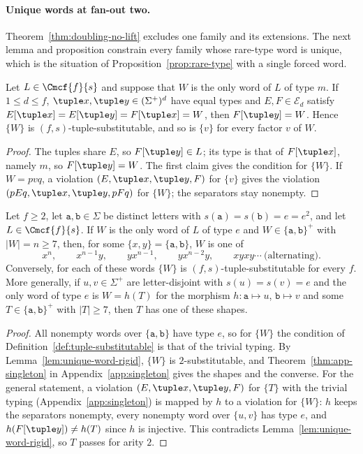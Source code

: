 \paragraph{Unique words at fan-out two.}
Theorem~\ref{thm:doubling-no-lift} excludes one family and its extensions.  The next lemma and
proposition constrain every family whose rare-type word is unique, which is the
situation of Proposition~\ref{prop:rare-type} with a single forced word.

\begin{lemma}
\label{lem:unique-word-rigid}
Let $L\in\Cmcf{f}{s}$ and suppose that $W$ is the only word of $L$ of type $m$.
If $1\le d\le f$, $\tuple x,\tuple y\in(\Sigma^+)^d$ have equal types and
$E,F\in\mathcal E_d$ satisfy $E[\tuple x]=E[\tuple y]=F[\tuple x]=W$, then
$F[\tuple y]=W$.  Hence $\{W\}$ is $(f,s)$-tuple-substitutable, and so is $\{v\}$
for every factor $v$ of $W$.
\end{lemma}

\begin{proof}
The tuples share $E$, so $F[\tuple y]\in L$; its type is that of $F[\tuple x]$,
namely $m$, so $F[\tuple y]=W$.  The first claim gives the condition for $\{W\}$.
If $W=pvq$, a violation $(E,\tuple x,\tuple y,F)$ for $\{v\}$ gives the violation
$(pEq,\tuple x,\tuple y,pFq)$ for $\{W\}$; the separators stay nonempty.
\end{proof}

\begin{proposition}
\label{prop:unique-two-letter-shapes}
Let $f\ge2$, let $\mathtt a,\mathtt b\in\Sigma$ be distinct letters with
$s(\mathtt a)=s(\mathtt b)=e=e^2$, and let $L\in\Cmcf{f}{s}$.  If $W$ is the only
word of $L$ of type $e$ and $W\in\{\mathtt a,\mathtt b\}^+$ with $|W|=n\ge7$, then,
for some $\{x,y\}=\{\mathtt a,\mathtt b\}$, $W$ is one of
\[
 x^n,\qquad x^{n-1}y,\qquad yx^{n-1},\qquad yx^{n-2}y,\qquad
 xyxy\cdots\ \text{(alternating)}.
\]
Conversely, for each of these words $\{W\}$ is $(f,s)$-tuple-substitutable for
every $f$.  More generally, if $u,v\in\Sigma^+$ are letter-disjoint with
$s(u)=s(v)=e$ and the only word of type $e$ is $W=h(T)$ for the morphism
$h:\mathtt a\mapsto u$, $\mathtt b\mapsto v$ and some $T\in\{\mathtt a,\mathtt b\}^+$ with
$|T|\ge7$, then $T$ has one of these shapes.
\end{proposition}

\begin{proof}
All nonempty words over $\{\mathtt a,\mathtt b\}$ have type $e$, so for
$\{W\}$ the condition of Definition~\ref{def:tuple-substitutable} is that of the
trivial typing.  By Lemma~\ref{lem:unique-word-rigid}, $\{W\}$ is
$2$-substitutable, and Theorem~\ref{thm:app-singleton} in
Appendix~\ref{app:singleton} gives the shapes and the converse.  For the general
statement, a violation $(E,\tuple x,\tuple y,F)$ for $\{T\}$ with the trivial
typing (Appendix~\ref{app:singleton}) is mapped by $h$ to a violation for $\{W\}$:
$h$ keeps the separators nonempty, every nonempty word over $\{u,v\}$ has type
$e$, and $h(F[\tuple y])\ne h(T)$ since $h$ is injective.  This contradicts
Lemma~\ref{lem:unique-word-rigid}, so $T$ passes for arity $2$.
\end{proof}

